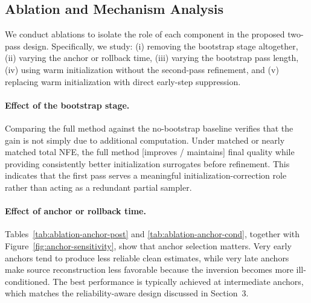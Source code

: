 \documentclass[letterpaper]{article} %
\begin{document}
\subsection{Ablation and Mechanism Analysis}

We conduct ablations to isolate the role of each component in the proposed two-pass design. Specifically, we study: (i) removing the bootstrap stage altogether, (ii) varying the anchor or rollback time, (iii) varying the bootstrap pass length, (iv) using warm initialization without the second-pass refinement, and (v) replacing warm initialization with direct early-step suppression.

\paragraph{Effect of the bootstrap stage.}
Comparing the full method against the no-bootstrap baseline verifies that the gain is not simply due to additional computation. Under matched or nearly matched total NFE, the full method [improves / maintains] final quality while providing consistently better initialization surrogates before refinement. This indicates that the first pass serves a meaningful initialization-correction role rather than acting as a redundant partial sampler.

\paragraph{Effect of anchor or rollback time.}
Tables~\ref{tab:ablation-anchor-post} and \ref{tab:ablation-anchor-cond}, together with Figure~\ref{fig:anchor-sensitivity}, show that anchor selection matters. Very early anchors tend to produce less reliable clean estimates, while very late anchors make source reconstruction less favorable because the inversion becomes more ill-conditioned. The best performance is typically achieved at intermediate anchors, which matches the reliability-aware design discussed in Section~3.

\begin{table}[t]
\centering
\caption{Anchor / rollback-depth ablation for posterior sampling on DIV2K 0.8k.}
\label{tab:ablation-anchor-post}
\end{table}
\end{document}
